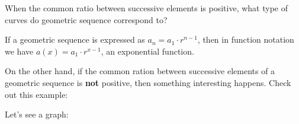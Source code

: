 \documentclass{ximera}
\begin{document}
\begin{question}
  When the common ratio between successive elements is positive, what
  type of curves do geometric sequence correspond to?
  \begin{multipleChoice}
  \end{multipleChoice}
  \begin{feedback}
  If a geometric sequence is expressed as $a_n = a_1 \cdot r^{n-1}$,
  then in function notation we have $a(x) = a_1 \cdot r^{x-1}$, an
  exponential function.
  \end{feedback}
\end{question}



On the other hand, if the common ration between successive elements of
a geometric sequence is \textbf{not} positive, then something
interesting happens. Check out this example:
\begin{image}
\end{image}
Let's see a graph:
\end{document}
